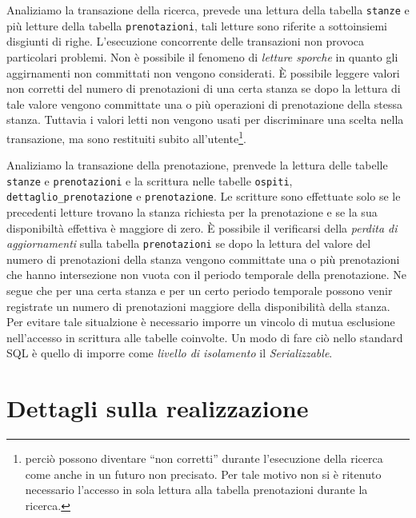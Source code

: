 \documentclass[a4paper]{article}
\begin{document}
Analiziamo la transazione della ricerca, prevede una lettura della
tabella \verb'stanze' e pi\`u letture della tabella
\verb'prenotazioni', tali letture sono riferite a sottoinsiemi
disgiunti di righe. L'esecuzione concorrente delle transazioni non
provoca particolari problemi. Non \`e possibile il fenomeno di
\emph{letture sporche} in quanto gli aggirnamenti non committati non
vengono considerati. \`E possibile leggere valori non corretti del
numero di prenotazioni di una certa stanza se dopo la lettura di tale
valore vengono committate una o pi\`u operazioni di prenotazione della
stessa stanza. Tuttavia i valori letti non vengono usati per
discriminare una scelta nella transazione, ma sono restituiti subito
all'utente\footnote{perci\`o possono diventare ``non corretti''
  durante l'esecuzione della ricerca come anche in un futuro non
  precisato. Per tale motivo non si \`e ritenuto necessario l'accesso
  in sola lettura alla tabella prenotazioni durante la
  ricerca.}. 

Analiziamo la transazione della prenotazione, prenvede la lettura
delle tabelle \verb'stanze' e \verb'prenotazioni' e la scrittura nelle
tabelle \verb'ospiti', \verb'dettaglio_prenotazione' e
\verb'prenotazione'. Le scritture sono effettuate solo se le
precedenti letture trovano la stanza richiesta per la prenotazione e
se la sua disponibilt\`a effettiva \`e maggiore di zero. \`E possibile
il verificarsi della \emph{perdita di aggiornamenti} sulla tabella
\verb'prenotazioni' se dopo la lettura del valore del numero di
prenotazioni della stanza vengono committate una o pi\`u prenotazioni
che hanno intersezione non vuota con il periodo temporale della
prenotazione. Ne segue che per una certa stanza e per un certo periodo
temporale possono venir registrate un numero di prenotazioni maggiore
della disponibilit\`a della stanza. Per evitare tale situalzione \`e
necessario imporre un vincolo di mutua esclusione nell'accesso in
scrittura alle tabelle coinvolte. Un modo di fare ci\`o nello standard
SQL \`e quello di imporre come \emph{livello di isolamento} il
\emph{Serializzable}.


\section{Dettagli sulla realizzazione}
\end{document}
